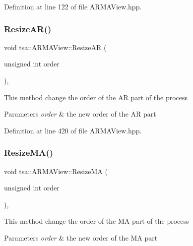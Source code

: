 Definition at line 122 of file A\+R\+M\+A\+View.\+hpp.

\mbox{\label{classtsa_1_1_a_r_m_a_view_a9fdd9c921d39b10a4d83379f69bdb160}} 
\subsubsection{\texorpdfstring{Resize\+A\+R()}{ResizeAR()}}
{\footnotesize\ttfamily void tsa\+::\+A\+R\+M\+A\+View\+::\+Resize\+AR (\begin{DoxyParamCaption}\item[{unsigned int}]{order }\end{DoxyParamCaption})\hspace{0.3cm}{\ttfamily [inline]}, {\ttfamily [private]}}

This method change the order of the AR part of the process


\begin{DoxyParams}{Parameters}
{\em order} & the new order of the AR part \\
\hline
\end{DoxyParams}


Definition at line 420 of file A\+R\+M\+A\+View.\+hpp.

\mbox{\label{classtsa_1_1_a_r_m_a_view_a757cddd07c0bb5bf0c4a8784e79f5900}} 
\subsubsection{\texorpdfstring{Resize\+M\+A()}{ResizeMA()}}
{\footnotesize\ttfamily void tsa\+::\+A\+R\+M\+A\+View\+::\+Resize\+MA (\begin{DoxyParamCaption}\item[{unsigned int}]{order }\end{DoxyParamCaption})\hspace{0.3cm}{\ttfamily [inline]}, {\ttfamily [private]}}

This method change the order of the MA part of the process


\begin{DoxyParams}{Parameters}
{\em order} & the new order of the MA part \\
\hline
\end{DoxyParams}


